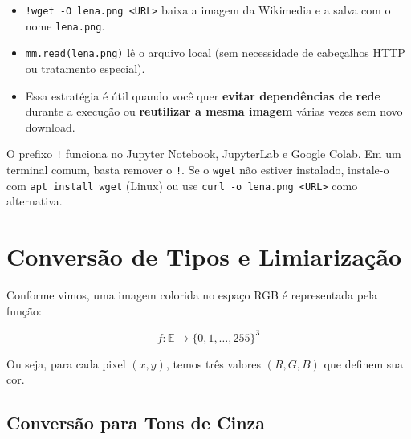 \documentclass[
  portuguese,
  letterpaper,
  openany,
  oneside,
  12pt,
  a4paper]{book}
\providecommand{\tightlist}{%
  \setlength{\itemsep}{0pt}\setlength{\parskip}{0pt}}
\begin{document}
\begin{itemize}
\tightlist
\item
  \texttt{!wget\ -O\ lena.png\ \textless{}URL\textgreater{}} baixa a
  imagem da Wikimedia e a salva com o nome \texttt{lena.png}.
\item
  \texttt{mm.read(\textquotesingle{}lena.png\textquotesingle{})} lê o
  arquivo local (sem necessidade de cabeçalhos HTTP ou tratamento
  especial).
\item
  Essa estratégia é útil quando você quer \textbf{evitar dependências de
  rede} durante a execução ou \textbf{reutilizar a mesma imagem} várias
  vezes sem novo download.
\end{itemize}

\begin{tcolorbox}[enhanced jigsaw, coltitle=black, colback=white, colbacktitle=quarto-callout-tip-color!10!white, bottomtitle=1mm, left=2mm, opacityback=0, breakable, rightrule=.15mm, titlerule=0mm, toptitle=1mm, opacitybacktitle=0.6, title=\textcolor{quarto-callout-tip-color}{\faLightbulb}\hspace{0.5em}{Nota}, colframe=quarto-callout-tip-color-frame, arc=.35mm, bottomrule=.15mm, toprule=.15mm, leftrule=.75mm]

O prefixo \texttt{!} funciona no Jupyter Notebook, JupyterLab e Google
Colab. Em um terminal comum, basta remover o \texttt{!}. Se o
\texttt{wget} não estiver instalado, instale-o com
\texttt{apt\ install\ wget} (Linux) ou use
\texttt{curl\ -o\ lena.png\ \textless{}URL\textgreater{}} como
alternativa.

\end{tcolorbox}

\section{Conversão de Tipos e
Limiarização}\label{conversuxe3o-de-tipos-e-limiarizauxe7uxe3o}

Conforme vimos, uma imagem colorida no espaço RGB é representada pela
função:

\[
f: \mathbb{E} \to \{0,1,\dots,255\}^3
\]

Ou seja, para cada pixel \((x,y)\), temos três valores \((R,G,B)\) que
definem sua cor.

\subsection*{Conversão para Tons de
Cinza}\label{conversuxe3o-para-tons-de-cinza}
\end{document}
